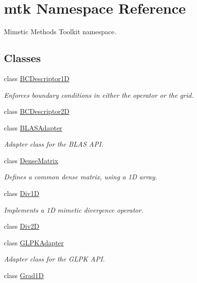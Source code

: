 \hypertarget{namespacemtk}{\section{mtk Namespace Reference}
\label{namespacemtk}
}


Mimetic Methods Toolkit namespace.  


\subsection*{Classes}
\begin{DoxyCompactItemize}
\item 
class \hyperlink{classmtk_1_1BCDescriptor1D}{B\+C\+Descriptor1\+D}
\begin{DoxyCompactList}\small\item\em Enforces boundary conditions in either the operator or the grid. \end{DoxyCompactList}\item 
class \hyperlink{classmtk_1_1BCDescriptor2D}{B\+C\+Descriptor2\+D}
\item 
class \hyperlink{classmtk_1_1BLASAdapter}{B\+L\+A\+S\+Adapter}
\begin{DoxyCompactList}\small\item\em Adapter class for the B\+L\+A\+S A\+P\+I. \end{DoxyCompactList}\item 
class \hyperlink{classmtk_1_1DenseMatrix}{Dense\+Matrix}
\begin{DoxyCompactList}\small\item\em Defines a common dense matrix, using a 1\+D array. \end{DoxyCompactList}\item 
class \hyperlink{classmtk_1_1Div1D}{Div1\+D}
\begin{DoxyCompactList}\small\item\em Implements a 1\+D mimetic divergence operator. \end{DoxyCompactList}\item 
class \hyperlink{classmtk_1_1Div2D}{Div2\+D}
\item 
class \hyperlink{classmtk_1_1GLPKAdapter}{G\+L\+P\+K\+Adapter}
\begin{DoxyCompactList}\small\item\em Adapter class for the G\+L\+P\+K A\+P\+I. \end{DoxyCompactList}\item 
class \hyperlink{classmtk_1_1Grad1D}{Grad1\+D}

\end{DoxyCompactItemize}
